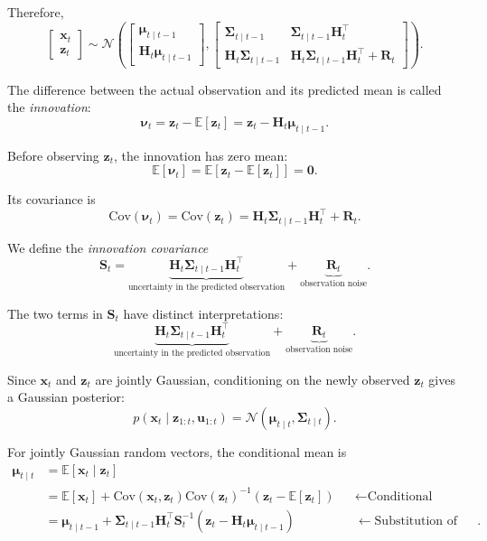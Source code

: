 \documentclass[../Bayesian_Inference.tex]{subfiles}
\begin{document}
Therefore,
\[
    \begin{bmatrix}
        \bm{x}_t \\
        \bm{z}_t
    \end{bmatrix}
    \sim
    \mathcal{N}\left(
        \begin{bmatrix}
            \bm{\mu}_{t\mid t-1} \\
            \mathbf{H}_t\bm{\mu}_{t\mid t-1}
        \end{bmatrix},
        \begin{bmatrix}
            \mathbf{\Sigma}_{t\mid t-1} & \mathbf{\Sigma}_{t\mid t-1}\mathbf{H}_t^\top \\
            \mathbf{H}_t\mathbf{\Sigma}_{t\mid t-1} & \mathbf{H}_t\mathbf{\Sigma}_{t\mid t-1}\mathbf{H}_t^\top + \mathbf{R}_t
        \end{bmatrix}
    \right).
\]

The difference between the actual observation and its predicted mean is called the \emph{innovation}:
\[
    \bm{\nu}_t =\bm{z}_t-\mathbb{E}[\bm{z}_t]=\bm{z}_t-\mathbf{H}_t\bm{\mu}_{t\mid t-1}.
\]

Before observing $\bm{z}_t$, the innovation has zero mean:
\[
    \mathbb{E}[\bm{\nu}_t] = \mathbb{E}\left[\bm{z}_t-\mathbb{E}[\bm{z}_t]\right] = \bm{0}.
\]

Its covariance is
\[
    \mathrm{Cov}(\bm{\nu}_t) = \mathrm{Cov}(\bm{z}_t) = \mathbf{H}_t\mathbf{\Sigma}_{t\mid t-1}\mathbf{H}_t^\top + \mathbf{R}_t.
\]

We define the \emph{innovation covariance}
\[
    \mathbf{S}_t = \underbrace{ \mathbf{H}_t\mathbf{\Sigma}_{t\mid t-1}\mathbf{H}_t^\top }_{\text{uncertainty in the predicted observation}} + \underbrace{ \mathbf{R}_t }_{\text{observation noise}}.
\]

The two terms in $\mathbf{S}_t$ have distinct interpretations:
\[
    \underbrace{ \mathbf{H}_t\mathbf{\Sigma}_{t\mid t-1}\mathbf{H}_t^\top }_{\text{uncertainty in the predicted observation}} + \underbrace{ \mathbf{R}_t }_{\text{observation noise}}.
\]

Since $\bm{x}_t$ and $\bm{z}_t$ are jointly Gaussian, conditioning on the newly observed $\bm{z}_t$ gives a Gaussian posterior:
\[
    p(\bm{x}_t\mid\bm{z}_{1:t},\bm{u}_{1:t}) = \mathcal{N}\left( \bm{\mu}_{t\mid t}, \mathbf{\Sigma}_{t\mid t} \right).
\]

For jointly Gaussian random vectors, the conditional mean is
\[
\begin{aligned}
    \bm{\mu}_{t\mid t} &= \mathbb{E}[\bm{x}_t\mid\bm{z}_t] \\
    &= \mathbb{E}[\bm{x}_t] + \mathrm{Cov}(\bm{x}_t,\bm{z}_t) \mathrm{Cov}(\bm{z}_t)^{-1} \left(\bm{z}_t-\mathbb{E}[\bm{z}_t]\right) &&\leftarrow \text{Conditional Gaussian formula} \\
    &= \bm{\mu}_{t\mid t-1} + \mathbf{\Sigma}_{t\mid t-1}\mathbf{H}_t^\top\mathbf{S}_t^{-1} \left(\bm{z}_t-\mathbf{H}_t\bm{\mu}_{t\mid t-1}\right) &&\leftarrow \text{Substitution of mean and covariance}.
\end{aligned}
\]
\end{document}
